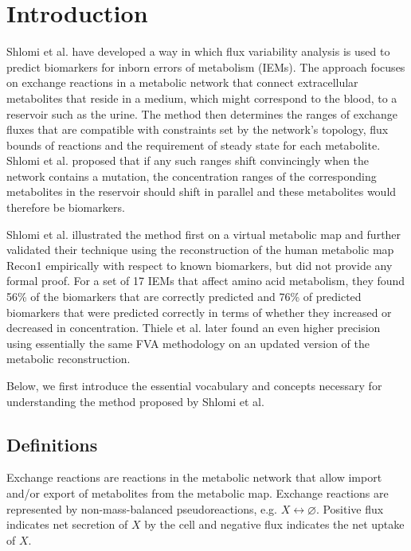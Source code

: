 \documentclass[10pt,a4paper,onecolumn]{article}
\begin{document}
\section{Introduction}\label{introduction}

Shlomi et al. \autocite{Shlomi2009} have developed a way in which flux
variability analysis \autocite{Mahadevan2003} is used to predict
biomarkers for inborn errors of metabolism (IEMs). The approach focuses
on exchange reactions in a metabolic network that connect extracellular
metabolites that reside in a medium, which might correspond to the
blood, to a reservoir such as the urine. The method then determines the
ranges of exchange fluxes that are compatible with constraints set by
the network's topology, flux bounds of reactions and the requirement of
steady state for each metabolite. Shlomi et al. proposed that if any
such ranges shift convincingly when the network contains a mutation, the
concentration ranges of the corresponding metabolites in the reservoir
should shift in parallel and these metabolites would therefore be
biomarkers.

Shlomi et al. illustrated the method first on a virtual metabolic map
and further validated their technique using the reconstruction of the
human metabolic map Recon1 \autocite{Duarte2007} empirically with
respect to known biomarkers, but did not provide any formal proof. For a
set of 17 IEMs that affect amino acid metabolism, they found 56\% of the
biomarkers that are correctly predicted and 76\% of predicted biomarkers
that were predicted correctly in terms of whether they increased or
decreased in concentration. Thiele et al. \autocite{Thiele2013} later
found an even higher precision using essentially the same FVA
methodology on an updated version of the metabolic reconstruction.

Below, we first introduce the essential vocabulary and concepts
necessary for understanding the method proposed by Shlomi et al.

\subsection{Definitions}\label{definitions}

Exchange reactions are reactions in the metabolic network that allow
import and/or export of metabolites from the metabolic map. Exchange
reactions are represented by non-mass-balanced pseudoreactions, e.g.
\(X \leftrightarrow \varnothing\). Positive flux indicates net secretion
of \(X\) by the cell and negative flux indicates the net uptake of
\(X\).
\end{document}

